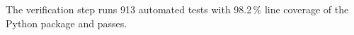 The verification step runs 913 automated tests with 98.2\,\% line coverage of the Python package and passes.
